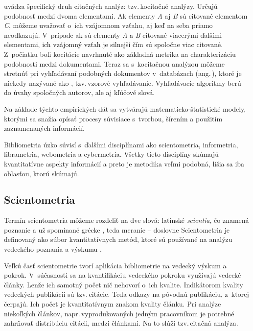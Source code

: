 \citet{Vavrikova2008} uvádza špecifický druh citačných analýz: tzv.\,kocitačné
analýzy.  Určujú podobnosť medzi dvoma elementami.  Ak
elementy \emph{A} aj \emph{B} sú citované elementom \emph{C}, môžeme uvažovať
o~ich vzájomnom vzťahu, aj keď na seba priamo neodkazujú.  V~prípade ak sú
elementy \emph{A} a \emph{B} citované viacerými ďalšími elementami, ich vzájomný
vzťah je silnejší čím sú spoločne viac citované.  Z~počiatku boli kocitácie
navrhnuté ako základná metrika na charakterizáciu podobnosti medzi dokumentami.
Teraz sa s~kocitačnou analýzou môžeme stretnúť pri vyhľadávaní podobných
dokumentov v~databázach (ang.\,), ktoré je niekedy
nazývané ako , tzv.\,vzorové vyhľadávanie.  Vyhľadávacie
algoritmy berú do úvahy spoločných autorov, ale aj kľúčové slová.

Na základe týchto empirických dát sa vytvárajú matematicko-štatistické modely,
ktorými sa snažia opísať procesy súvisiace s~tvorbou, šírením a použitím
zaznamenaných informácií.

Bibliometria úzko súvisí s~ďalšími disciplínami ako scientometria, informetria,
librametria, webometria a cybermetria.  Všetky tieto disciplíny skúmajú
kvantitatívne aspekty informácií a preto je metodika veľmi podobná, líšia sa iba
oblasťou, ktorú skúmajú.


\subsection{Scientometria}

Termín scientometria môžeme rozdeliť na dve slová: latinské
\emph{scientia}, čo znamená poznanie a už
spomínané grécke , teda
meranie -- doslovne  Scientometria je definovaný ako
súbor kvantitatívnych metód, ktoré sú používané na analýzu vedeckého poznania a
výskumu \citep{Hood2001}.

Veľkú časť scientometrie tvorí aplikácia bibliometrie na vedecký výskum a
pokrok.  V~súčasnosti sa na kvantifikáciu vedeckého pokroku využívajú vedecké
články.  Lenže ich samotný počet nič nehovorí o~ich kvalite.  Indikátorom
kvality vedeckých publikácii sú tzv.\,citácie.  Teda odkazy na pôvodnú
publikáciu, z~ktorej čerpajú.  Ich počet je kvantitatívnym znakom kvality
článku.  Pri analýze niekoľkých článkov, napr.\,vyprodukovaných jedným
pracovníkom je potrebné zahrňovať distribúciu citácii, medzi článkami.  Na to
slúži tzv.\,citačná analýza.


